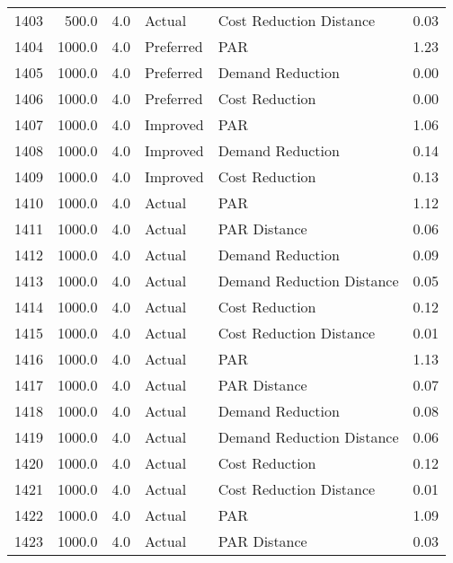 \begin{longtable}{lrrllr}
1403 &        500.0 &     4.0 &         Actual &    Cost Reduction Distance &   0.03 \\
1404 &       1000.0 &     4.0 &      Preferred &                        PAR &   1.23 \\
1405 &       1000.0 &     4.0 &      Preferred &           Demand Reduction &   0.00 \\
1406 &       1000.0 &     4.0 &      Preferred &             Cost Reduction &   0.00 \\
1407 &       1000.0 &     4.0 &       Improved &                        PAR &   1.06 \\
1408 &       1000.0 &     4.0 &       Improved &           Demand Reduction &   0.14 \\
1409 &       1000.0 &     4.0 &       Improved &             Cost Reduction &   0.13 \\
1410 &       1000.0 &     4.0 &         Actual &                        PAR &   1.12 \\
1411 &       1000.0 &     4.0 &         Actual &               PAR Distance &   0.06 \\
1412 &       1000.0 &     4.0 &         Actual &           Demand Reduction &   0.09 \\
1413 &       1000.0 &     4.0 &         Actual &  Demand Reduction Distance &   0.05 \\
1414 &       1000.0 &     4.0 &         Actual &             Cost Reduction &   0.12 \\
1415 &       1000.0 &     4.0 &         Actual &    Cost Reduction Distance &   0.01 \\
1416 &       1000.0 &     4.0 &         Actual &                        PAR &   1.13 \\
1417 &       1000.0 &     4.0 &         Actual &               PAR Distance &   0.07 \\
1418 &       1000.0 &     4.0 &         Actual &           Demand Reduction &   0.08 \\
1419 &       1000.0 &     4.0 &         Actual &  Demand Reduction Distance &   0.06 \\
1420 &       1000.0 &     4.0 &         Actual &             Cost Reduction &   0.12 \\
1421 &       1000.0 &     4.0 &         Actual &    Cost Reduction Distance &   0.01 \\
1422 &       1000.0 &     4.0 &         Actual &                        PAR &   1.09 \\
1423 &       1000.0 &     4.0 &         Actual &               PAR Distance &   0.03 \\

\end{longtable}
